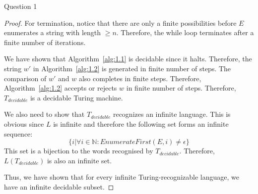\begin{solution}{Question 1}
\begin{proof}
      For termination, notice that there are only a finite possibilities before $E$ enumerates a string with length $\geq n$. Therefore, the while loop terminates after a finite number of iterations.\par
      We have shown that Algorithm~\ref{alg:1.1} is decidable since it halts. Therefore, the string $w'$ in Algorithm~\ref{alg:1.2} is generated in finite number of steps. The comparison of $w'$ and $w$ also completes in finite steps. Therefore, Algorithm~\ref{alg:1.2} accepts or rejects $w$ in finite number of steps. Therefore, $T_{decidable}$ is a decidable Turing machine.\par
      We also need to show that $T_{decidable}$ recognizes an infinite language. This is obvious since $L$ is infinite and therefore the following set forms an infinite sequence:
      \begin{equation}
        \{i | \forall i \in \mathbb{N}: EnumerateFirst(E, i) \neq \epsilon\}
      \end{equation}
      This set is a bijection to the words recognised by $T_{decidable}$. Therefore, $L(T_{decidable})$ is also an infinite set.\par
      Thus, we have shown that for every infinite Turing-recognizable language, we have an infinite decidable subset.
    \end{proof}
\end{solution}
